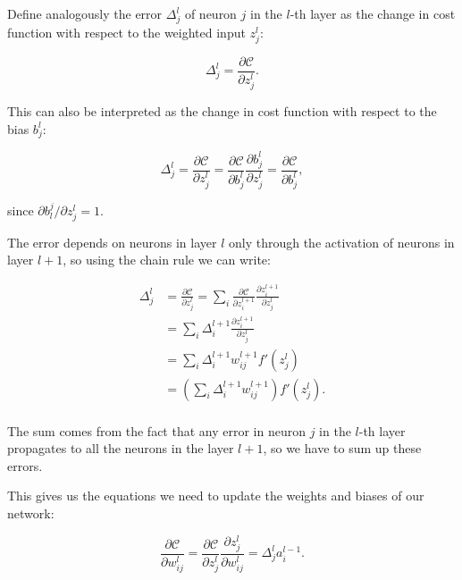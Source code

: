 Define analogously the error $\Delta_j^l$ of neuron $j$ in the $l$-th layer as the change in cost function with respect to the weighted input
$z_j^l$:

\begin{equation}
 \Delta_j^l = \frac{\partial \mathcal{C}}{\partial z_j^l} .
\end{equation}

This can also be interpreted as the change in cost function with respect to the bias $b_j^l$:

\begin{equation}
 \Delta_j^l = \frac{\partial \mathcal{C}}{\partial z_j^l} = \frac{\partial \mathcal{C}}{\partial b_j^l} 
\frac{\partial b_j^l}{\partial z_j^l} = \frac{\partial \mathcal{C}}{\partial b_j^l} ,
\end{equation}

since $ \partial b_l^j / \partial z_j^l = 1$.

The error depends on neurons in layer $l$ only through the 
activation of neurons in layer $l + 1$, so using the chain rule we can write:

\begin{equation}\label{eq:error}
\begin{split}
\Delta_j^l &= \frac{\partial \mathcal{C}}{\partial z_j^l} = \sum_i \frac{\partial \mathcal{C}}{\partial z_i^{l+1}}
\frac{\partial z_i^{l+1}}{\partial z_j^l} \\
           &= \sum_i \Delta_i^{l+1} \frac{\partial z_i^{l+1}}{\partial z_j^l} \\
           &= \sum_i \Delta_i^{l+1} w_{ij}^{l+1} f'(z_j^l) \\
           &= \left( \sum_i \Delta_i^{l+1} w_{ij}^{l+1} \right) f'(z_j^l) .\\
\end{split}
\end{equation}

The sum comes from the fact that any error in neuron $j$ in the $l$-th layer propagates to all the neurons
in the layer $l + 1$,
so we have to sum up these errors.

This gives us the equations we need to update the weights and biases of our network:

\begin{equation}
 \frac{\partial \mathcal{C}}{\partial w_{ij}^l} 
= \frac{\partial \mathcal{C}}{\partial z_j^l} 
\frac{\partial z_j^l}{\partial w_{ij}^l}
= \Delta_j^l a_i^{l-1} .
\end{equation}


